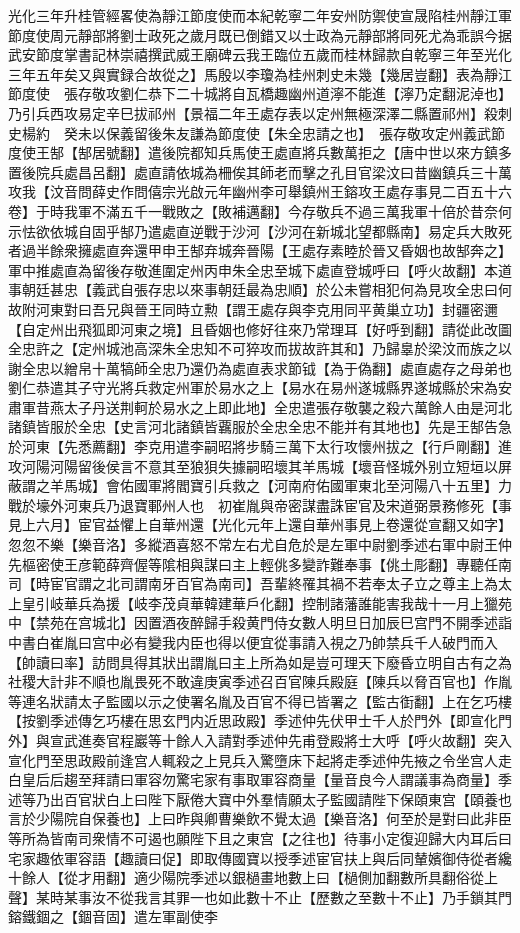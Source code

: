 光化三年升桂管經畧使為靜江節度使而本紀乾寧二年安州防禦使宣晟陷桂州靜江軍節度使周元靜部將劉士政死之歲月既已倒錯又以士政為元靜部將同死尤為乖誤今据武安節度掌書記林崇禧撰武威王廟碑云我王臨位五歲而桂林歸款自乾寧三年至光化三年五年矣又與實録合故從之】馬殷以李瓊為桂州刺史未幾【幾居豈翻】表為靜江節度使　張存敬攻劉仁恭下二十城將自瓦橋趣幽州道濘不能進【濘乃定翻泥淖也】乃引兵西攻易定辛巳拔祁州【景福二年王處存表以定州無極深澤二縣置祁州】殺刺史楊約　癸未以保義留後朱友謙為節度使【朱全忠請之也】　張存敬攻定州義武節度使王郜【郜居號翻】遣後院都知兵馬使王處直將兵數萬拒之【唐中世以來方鎮多置後院兵處昌呂翻】處直請依城為柵俟其師老而擊之孔目官梁汶曰昔幽鎮兵三十萬攻我【汶音問薛史作問僖宗光啟元年幽州李可舉鎮州王鎔攻王處存事見二百五十六卷】于時我軍不滿五千一戰敗之【敗補邁翻】今存敬兵不過三萬我軍十倍於昔奈何示怯欲依城自固乎郜乃遣處直逆戰于沙河【沙河在新城北望都縣南】易定兵大敗死者過半餘衆擁處直奔還甲申王郜弃城奔晉陽【王處存素睦於晉又昏姻也故郜奔之】軍中推處直為留後存敬進圍定州丙申朱全忠至城下處直登城呼曰【呼火故翻】本道事朝廷甚忠【義武自張存忠以來事朝廷最為忠順】於公未嘗相犯何為見攻全忠曰何故附河東對曰吾兄與晉王同時立勲【謂王處存與李克用同平黄巢立功】封疆密邇【自定州出飛狐即河東之境】且昏姻也修好往來乃常理耳【好呼到翻】請從此改圖全忠許之【定州城池高深朱全忠知不可猝攻而拔故許其和】乃歸辠於梁汶而族之以謝全忠以繒帛十萬犒師全忠乃還仍為處直表求節钺【為于偽翻】處直處存之母弟也劉仁恭遣其子守光將兵救定州軍於易水之上【易水在易州遂城縣界遂城縣於宋為安肅軍昔燕太子丹送荆軻於易水之上即此地】全忠遣張存敬襲之殺六萬餘人由是河北諸鎮皆服於全忠【史言河北諸鎮皆覊服於全忠全忠不能并有其地也】先是王郜告急於河東【先悉薦翻】李克用遣李嗣昭將步騎三萬下太行攻懷州拔之【行戶剛翻】進攻河陽河陽留後侯言不意其至狼狽失據嗣昭壞其羊馬城【壞音怪城外别立短垣以屏蔽謂之羊馬城】會佑國軍將閻寶引兵救之【河南府佑國軍東北至河陽八十五里】力戰於壕外河東兵乃退寶鄆州人也　初崔胤與帝密謀盡誅宦官及宋道弼景務修死【事見上六月】宦官益懼上自華州還【光化元年上還自華州事見上卷還從宣翻又如字】忽忽不樂【樂音洛】多縱酒喜怒不常左右尤自危於是左軍中尉劉季述右軍中尉王仲先樞密使王彦範薛齊偓等隂相與謀曰主上輕佻多變詐難奉事【佻土彫翻】專聽任南司【時宦官謂之北司謂南牙百官為南司】吾輩終罹其禍不若奉太子立之尊主上為太上皇引岐華兵為援【岐李茂貞華韓建華戶化翻】控制諸藩誰能害我哉十一月上獵苑中【禁苑在宫城北】因置酒夜醉歸手殺黄門侍女數人明旦日加辰巳宫門不開季述詣中書白崔胤曰宫中必有變我内臣也得以便宜從事請入視之乃帥禁兵千人破門而入【帥讀曰率】訪問具得其狀出謂胤曰主上所為如是豈可理天下廢昏立明自古有之為社稷大計非不順也胤畏死不敢違庚寅季述召百官陳兵殿庭【陳兵以脅百官也】作胤等連名狀請太子監國以示之使署名胤及百官不得已皆署之【監古衘翻】上在乞巧樓【按劉季述傳乞巧樓在思玄門内近思政殿】季述仲先伏甲士千人於門外【即宣化門外】與宣武進奏官程巖等十餘人入請對季述仲先甫登殿將士大呼【呼火故翻】突入宣化門至思政殿前逢宫人輒殺之上見兵入驚墮床下起將走季述仲先掖之令坐宫人走白皇后后趨至拜請曰軍容勿驚宅家有事取軍容商量【量音良今人謂議事為商量】季述等乃出百官狀白上曰陛下厭倦大寶中外羣情願太子監國請陛下保頤東宫【頤養也言於少陽院自保養也】上曰昨與卿曹樂飲不覺太過【樂音洛】何至於是對曰此非臣等所為皆南司衆情不可遏也願陛下且之東宫【之往也】待事小定復迎歸大内耳后曰宅家趣依軍容語【趣讀曰促】即取傳國寶以授季述宦官扶上與后同輦嬪御侍從者纔十餘人【從才用翻】適少陽院季述以銀檛畫地數上曰【檛側加翻數所具翻俗從上聲】某時某事汝不從我言其罪一也如此數十不止【歷數之至數十不止】乃手鎖其門鎔鐵錮之【錮音固】遣左軍副使李